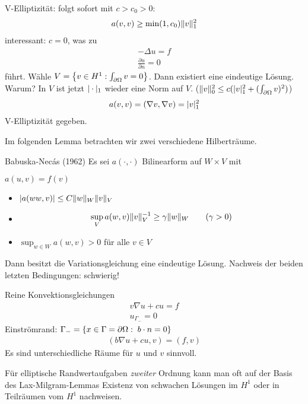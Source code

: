 \begin{beispiel}
\begin{enumerate}
V-Elliptizität: folgt sofort mit $c> c_0 >0$:
\begin{align*}
  a(v, v)\geq \min (1, c_0) \|v\|_1^2
\end{align*}
interessant: $c = 0$, was zu 
\begin{align*}
  -\Delta u = f\\
\frac{\partial u}{\partial n} = 0
\end{align*}
führt. Wähle $V = \left\{ v \in H^1: \int_{\partial \Omega} v = 0 \right\}$. Dann existiert eine eindeutige Lösung. Warum? In $V$ ist jetzt $|\cdot| _1$ wieder eine Norm auf $V$. ($\|v\| _0^2 \leq c(|v| _1^2 + (\int_{\partial \Omega} v)^2)$)
\begin{align*}
  a(v, v) = (\nabla v, \nabla v) = |v|_1^2
\end{align*}
V-Elliptizität gegeben.
  \end{enumerate}
\end{beispiel}
Im folgenden Lemma betrachten wir zwei verschiedene Hilberträume.
\begin{lemma} Babuska-Necás (1962)
Es sei $a(\cdot, \cdot)$ Bilinearform auf $W \times V$ mit 

$a(u,v) = f(v)$
\begin{itemize}
\item $|a(ww, v)| \leq C \|w\|_W \|v\|_V$
\item
  \begin{align*}
    \sup_V a(w, v )\|v\|_V^{-1} \geq \gamma \|w\| _W \qquad (\gamma >0)
  \end{align*}
\item $\sup_{w \in W} a(w, v) > 0$ für alle $v \in V$
\end{itemize}
Dann besitzt die Variationsgleichung eine eindeutige Lösung. Nachweis der beiden letzten Bedingungen: schwierig!
\end{lemma}
\begin{beispiel}Reine Konvektionsgleichungen
  \begin{align*}
    v \nabla u + c u = f\\
u_{\Gamma_-} = 0
  \end{align*}
Einströmrand: $\Gamma_- = \left\{ x \in \Gamma = \partial \Omega: \; b\cdot n = 0  \right\}$
\begin{align*}
  (b \nabla u + c u , v) = (f, v)
\end{align*}
Es sind unterschiedliche Räume für $u$ und $v$ sinnvoll. 
\end{beispiel}
Für elliptische Randwertaufgaben \emph{zweiter} Ordnung kann man oft auf der Basis des Lax-Milgram-Lemmas Existenz von schwachen Lösungen im $H^1$ oder in Teilräumen vom $H^1$ nachweisen.


